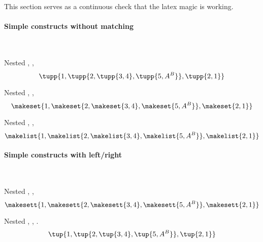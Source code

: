 This section serves as a continuous check that the latex magic is working.

\paragraph{Simple constructs without matching}~

Nested \str{\tupp}, \str{\tupp}, \str{\tupp}
%
\begin{equation}
    \tupp{ 1, \tupp{2, \tupp{3, 4}, \tupp{5, A^B}}, \tupp{2,1}}
\end{equation}

Nested \str{\makeset}, \str{\makeset}, \str{\makeset}
%
\begin{equation}
    \makeset{ 1, \makeset{2, \makeset{3, 4}, \makeset{5, A^B}}, \makeset{2,1}}
\end{equation}

Nested \str{\makelist}, \str{\makelist}, \str{\makelist}
%
\begin{equation}
    \makelist{ 1, \makelist{2, \makelist{3, 4}, \makelist{5, A^B}}, \makelist{2,1}}
\end{equation}

\paragraph{Simple constructs with left/right}~

Nested \str{\makesett}, \str{\makesett}, \str{\makesett}
%
\begin{equation}
    \makesett{ 1, \makesett{2, \makesett{3, 4}, \makesett{5, A^B}}, \makesett{2,1}}
\end{equation}

Nested \str{\tup}, \str{\tup}, \str{\tup}.
%
\begin{equation}
    \tup{1, \tup{2, \tup{3, 4}, \tup{5, A^B}}, \tup{2,1}}
\end{equation}

